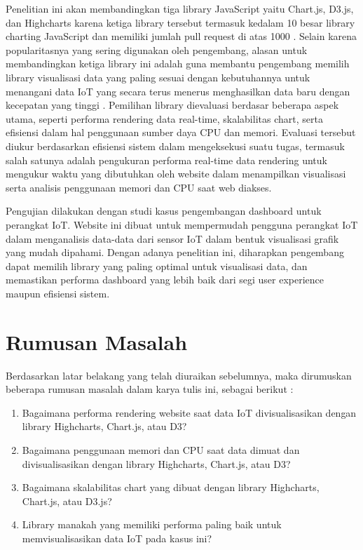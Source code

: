 Penelitian ini  akan membandingkan tiga library JavaScript yaitu Chart.js, D3.js, dan Highcharts karena ketiga library tersebut termasuk kedalam 10 besar library charting JavaScript dan memiliki jumlah pull request di atas 1000 \cite{ossinsight}. Selain karena popularitasnya yang sering digunakan oleh pengembang, alasan untuk membandingkan ketiga library ini adalah guna membantu pengembang memilih library visualisasi data yang paling sesuai dengan kebutuhannya untuk menangani data IoT yang secara terus menerus menghasilkan data baru dengan kecepatan yang tinggi \cite{Khairy2023}. Pemilihan library dievaluasi berdasar beberapa aspek utama, seperti performa rendering data real-time, skalabilitas chart, serta efisiensi dalam hal penggunaan sumber daya CPU dan memori. Evaluasi tersebut diukur berdasarkan efisiensi sistem dalam mengeksekusi suatu tugas, termasuk salah satunya adalah pengukuran performa real-time data rendering untuk mengukur waktu yang dibutuhkan oleh website dalam menampilkan visualisasi \cite{Persson2021} serta analisis penggunaan memori dan CPU saat web diakses.

Pengujian dilakukan dengan studi kasus pengembangan dashboard untuk perangkat IoT. Website ini dibuat untuk mempermudah pengguna perangkat IoT dalam menganalisis data-data dari sensor IoT dalam bentuk visualisasi grafik yang mudah dipahami. Dengan adanya penelitian ini, diharapkan pengembang dapat memilih library yang paling optimal untuk visualisasi data, dan memastikan performa dashboard yang lebih baik dari segi user experience maupun efisiensi sistem.

\section{Rumusan Masalah}
Berdasarkan latar belakang yang telah diuraikan sebelumnya, maka dirumuskan beberapa rumusan masalah dalam karya tulis ini, sebagai berikut :
\begin{enumerate}
    \item Bagaimana performa rendering website saat data IoT divisualisasikan dengan library Highcharts, Chart.js, atau D3? 
    \item Bagaimana penggunaan memori dan CPU saat data dimuat dan divisualisasikan dengan library Highcharts, Chart.js, atau D3? 
    \item Bagaimana skalabilitas chart yang dibuat dengan library Highcharts, Chart.js, atau D3.js? 
    \item Library manakah yang memiliki performa paling baik untuk memvisualisasikan data IoT pada kasus ini? 
\end{enumerate}

